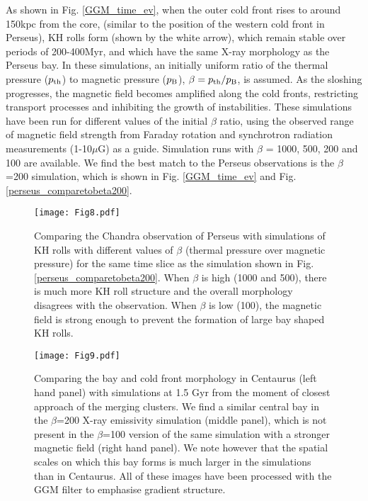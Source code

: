\documentclass[useAMS,usenatbib]{mn2e}
\begin{document}
As shown in Fig.
\ref{GGM_time_ev}, when the outer cold front rises to around 150kpc from the
core, (similar to the position of the western cold front in Perseus), KH rolls
form (shown by the white arrow), which remain stable over periods of 200-400Myr,
and which have the same X-ray morphology as the Perseus bay. In these simulations, an initially uniform ratio of the thermal pressure ($p_{\rm th}$) to magnetic pressure ($p_{\rm B}$), $\beta= p_{\rm th} / p_{\rm B}$, 
is assumed. As the sloshing progresses, the magnetic field becomes amplified along the cold fronts, restricting transport processes and inhibiting the growth of instabilities. These simulations
have been run for different values of the initial $\beta$ ratio, using the observed range of magnetic field strength from Faraday rotation and synchrotron radiation measurements (1-10$\mu$G) as a guide. Simulation 
runs with $\beta$ = 1000, 500, 200 and 100 are available. We find the best match to the Perseus observations is the $\beta$=200 simulation, which is shown in Fig. \ref{GGM_time_ev} and Fig. \ref{perseus_comparetobeta200}. 

\begin{figure*}
  \begin{center}
    \leavevmode
\texttt{[image: Fig8.pdf]}
      \caption{Comparing the Chandra observation of Perseus with simulations of
KH rolls with different values of
$\beta$ (thermal pressure over magnetic pressure) for the same time slice as the
simulation shown in Fig. \ref{perseus_comparetobeta200}. When $\beta$ is high
(1000 and 500), there is much more KH roll structure and the overall morphology
disagrees with the observation. When $\beta$ is low (100), the magnetic field is
strong enough to prevent the formation of large bay shaped KH rolls. }
      \label{perseus_comparebetasims}
  \end{center}
\end{figure*}


\begin{figure*}
  \begin{center}
    \leavevmode
\texttt{[image: Fig9.pdf]}
      \caption{Comparing the bay and cold front morphology in Centaurus (left hand panel) with simulations at 1.5 Gyr from the moment of closest approach of the 
merging clusters. We find 
a similar central bay in the $\beta$=200 X-ray emissivity simulation (middle panel), which is not present in the $\beta$=100 version of the same simulation
with a stronger magnetic field (right hand panel). We note however that the spatial scales on which this bay forms is much larger in the
simulations than in Centaurus. All of these images have been processed with the GGM filter to emphasise gradient structure. }
      \label{Centaurus_comparebetasims}
  \end{center}
\end{figure*}
\end{document}
